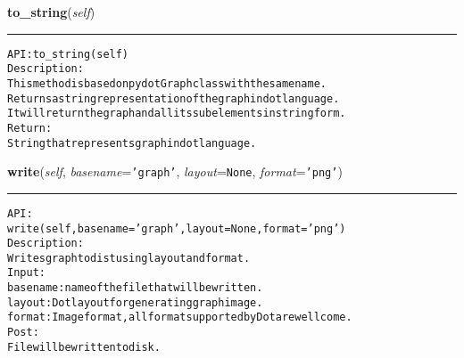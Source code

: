     \label{coinor:gimpy:graph:Graph:to_string}

    \vspace{0.5ex}

\hspace{.8\funcindent}\begin{boxedminipage}{\funcwidth}

    \raggedright \textbf{to\_string}(\textit{self})

    \vspace{-1.5ex}

    \rule{\textwidth}{0.5\fboxrule}
\setlength{\parskip}{2ex}
\begin{alltt}

API: to\_string(self)
Description:
This method is based on pydot Graph class with the same name.
Returns a string representation of the graph in dot language.
It will return the graph and all its subelements in string form.
Return:
    String that represents graph in dot language.
\end{alltt}

\setlength{\parskip}{1ex}
    \end{boxedminipage}

    \label{coinor:gimpy:graph:Graph:write}

    \vspace{0.5ex}

\hspace{.8\funcindent}\begin{boxedminipage}{\funcwidth}

    \raggedright \textbf{write}(\textit{self}, \textit{basename}={\tt \texttt{'}\texttt{graph}\texttt{'}}, \textit{layout}={\tt None}, \textit{format}={\tt \texttt{'}\texttt{png}\texttt{'}})

    \vspace{-1.5ex}

    \rule{\textwidth}{0.5\fboxrule}
\setlength{\parskip}{2ex}
\begin{alltt}

API:
    write(self, basename = 'graph', layout = None, format='png')
Description:
Writes graph to dist using layout and format.
Input:
    basename: name of the file that will be written.
    layout: Dot layout for generating graph image.
    format: Image format, all format supported by Dot are wellcome.
Post:
    File will be written to disk.
\end{alltt}

\setlength{\parskip}{1ex}
    \end{boxedminipage}


